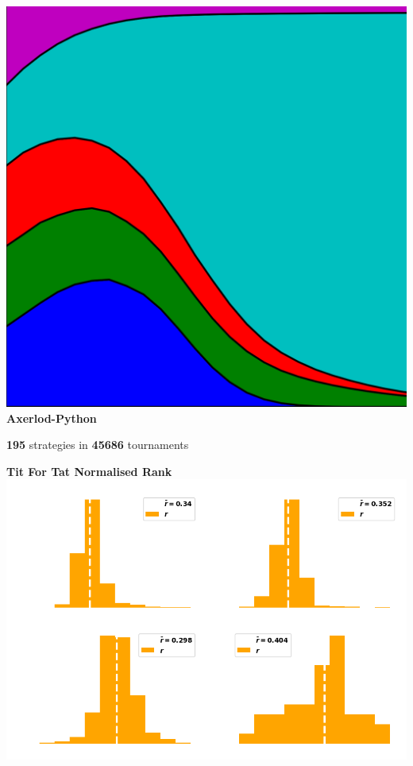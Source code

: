\documentclass{beamer}
\begin{document}
\begin{frame}
    \begin{center}
        \includegraphics[width=.25\textwidth]{static/axelrod-logo.png} \\
        \textbf{Axerlod-Python}
    \end{center}
\end{frame}

\begin{frame}
    \begin{center}
    \Large{\textbf{195}} \small{strategies in} \Large{\textbf{45686}} \small{tournaments}
    \end{center}
\end{frame}

\begin{frame}
    \begin{center}
        \textbf{Tit For Tat Normalised Rank} \\ \vspace{1cm}
        \includegraphics[width=.8\textwidth]{static/tit_for_tat_r_distributions.png} 
    \end{center}
\end{frame}
\end{document}
